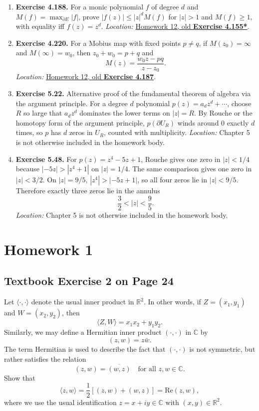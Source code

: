 \documentclass{article}
\begin{document}
\begin{enumerate}
  \item \textbf{Exercise 4.188.}
  For a monic polynomial $f$ of degree $d$ and
  $M(f)=\max_{\partial E}|f|$, prove
  $|f(z)|\le |z|^dM(f)$ for $|z|>1$ and $M(f)\ge1$, with equality iff
  $f(z)=z^d$.  \textit{Location:}
  \hyperref[sec:ca-ex-4-155-star]{Homework 12, old \textbf{Exercise 4.155*}}.

  \item \textbf{Exercise 4.220.}
  For a Mobius map with fixed points $p\ne q$, if $M(z_0)=\infty$ and
  $M(\infty)=w_0$, then $z_0+w_0=p+q$ and
  \[
    M(z)=\frac{w_0z-pq}{z-z_0}.
  \]
  \textit{Location:}
  \hyperref[sec:ca-ex-4-187]{Homework 12, old \textbf{Exercise 4.187}}.

  \item \textbf{Exercise 5.22.}
  Alternative proof of the fundamental theorem of algebra via the argument
  principle.  For a degree $d$ polynomial $p(z)=a_dz^d+\cdots$, choose $R$
  so large that $a_dz^d$ dominates the lower terms on $|z|=R$.  By Rouche
  or the homotopy form of the argument principle, $p(\partial U_R)$ winds
  around $0$ exactly $d$ times, so $p$ has $d$ zeros in $U_R$, counted with
  multiplicity.
  \textit{Location:} Chapter 5 is not otherwise included in the homework body.

  \item \textbf{Exercise 5.48.}
  For $p(z)=z^4-5z+1$, Rouche gives one zero in $|z|<1/4$ because
  $|-5z|>|z^4+1|$ on $|z|=1/4$.  The same comparison gives one zero in
  $|z|<3/2$.  On $|z|=9/5$, $|z^4|>|-5z+1|$, so all four zeros lie in
  $|z|<9/5$.  Therefore exactly three zeros lie in the annulus
  \[
    \frac32<|z|<\frac95.
  \]
  \textit{Location:} Chapter 5 is not otherwise included in the homework body.
\end{enumerate}

\newpage

\section{Homework 1}

\subsection{Textbook Exercise 2 on Page 24}

Let $\langle \cdot, \cdot \rangle$ denote the usual inner product in
$\mathbb{R}^2$. In other words, if $Z = (x_1, y_1)$ and $W = (x_2, y_2)$, then
\[
  \langle Z, W \rangle = x_1 x_2 + y_1 y_2.
\]
Similarly, we may define a Hermitian inner product $(\cdot, \cdot)$
in $\mathbb{C}$ by
\[
  (z, w) = z \bar{w}.
\]
The term Hermitian is used to describe the fact that $(\cdot, \cdot)$
is not symmetric, but rather satisfies the relation
\[
  (z, w) = \overline{(w, z)} \quad \text{for all } z, w \in \mathbb{C}.
\]
Show that
\[
  \langle z, w \rangle = \frac{1}{2} [(z, w) + (w, z)] = \text{Re}(z, w),
\]
where we use the usual identification $z = x + iy \in \mathbb{C}$
with $(x, y) \in \mathbb{R}^2$.
\end{document}
